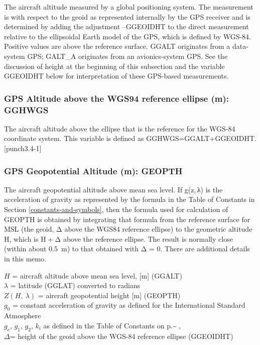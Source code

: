 \documentclass[
  english,
]{book}
\begin{document}
The aircraft altitude measured by a global positioning system. The measurement is with respect to the geoid as represented internally by the GPS receiver and is determined by adding the adjustment --GGEOIDHT to the direct measurement relative to the ellipsoidal Earth model of the GPS, which is defined by WGS-84. Positive values are above the reference surface. GGALT originates from a data-system GPS; GALT\_A originates from an avionics-system GPS. See the discussion of height at the beginning of this subsection and the variable GGEOIDHT below for interpretation of these GPS-based measurements.

\hypertarget{gghwgs}{%
\subsubsection*{GPS Altitude above the WGS94 reference ellipse (m): GGHWGS}\label{gghwgs}}

The aircraft altitude above the ellipse that is the reference for the WGS-84 coordinate system. This variable is defined as GGHWGS=GGALT{+}GGEOIDHT.\protect\hypertarget{punch3.4-1}{}{{[}punch3.4-1{]}}

\hypertarget{geoph}{%
\subsubsection*{GPS Geopotential Altitude (m): GEOPTH}\label{geoph}}

The aircraft geopotential altitude above mean sea level. If {g(z, λ)} is the acceleration of gravity as represented by the formula in the Table of Constants in Section \ref{constants-and-symbols}, then the formula used for calculation of GEOPTH is obtained by integrating that formula from the reference surface for MSL (the geoid, {Δ} above the WGS84 reference ellipse) to the geometric altitude {H}, which is {H + Δ} above the reference ellipse. The result is normally close (within about 0.5~m) to that obtained with {Δ = 0}. There are additional details in this memo.

\(H\) = aircraft altitude above mean sea level, {[}m{]} (GGALT)\\
\(\lambda\) = latitude (GGLAT) converted to radians\\
\(Z(H,\ \lambda)\) = aircraft geopotential height {[}m{]} (GEOPTH)\\
\(g_{0}\) = constant acceleration of gravity as defined for the International
Standard Atmosphere\\
\(g_{e},\,g_{1},\,g_{2},\,k_{i}\) as defined in the Table of Constants
on p.\textasciitilde{} \pageref{constants-table},\\
\(\Delta\)= height of the geoid above the WGS-84 reference ellipse
(GGEOIDHT)
\end{document}
